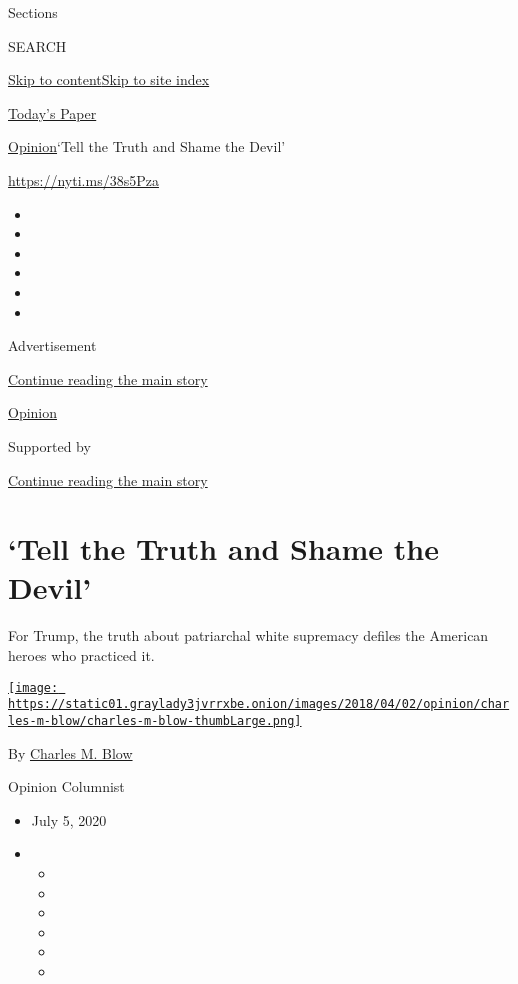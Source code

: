 Sections

SEARCH

\protect\hyperlink{site-content}{Skip to
content}\protect\hyperlink{site-index}{Skip to site index}

\href{https://myaccount.nytimes3xbfgragh.onion/auth/login?response_type=cookie\&client_id=vi}{}

\href{https://www.nytimes3xbfgragh.onion/section/todayspaper}{Today's
Paper}

\href{/section/opinion}{Opinion}\textbar{}`Tell the Truth and Shame the
Devil'

\url{https://nyti.ms/38s5Pza}

\begin{itemize}
\item
\item
\item
\item
\item
\item
\end{itemize}

Advertisement

\protect\hyperlink{after-top}{Continue reading the main story}

\href{/section/opinion}{Opinion}

Supported by

\protect\hyperlink{after-sponsor}{Continue reading the main story}

\hypertarget{tell-the-truth-and-shame-the-devil}{%
\section{`Tell the Truth and Shame the
Devil'}\label{tell-the-truth-and-shame-the-devil}}

For Trump, the truth about patriarchal white supremacy defiles the
American heroes who practiced it.

\href{https://www.nytimes3xbfgragh.onion/by/charles-m-blow}{\texttt{[image: https://static01.graylady3jvrrxbe.onion/images/2018/04/02/opinion/charles-m-blow/charles-m-blow-thumbLarge.png]}}

By \href{https://www.nytimes3xbfgragh.onion/by/charles-m-blow}{Charles
M. Blow}

Opinion Columnist

\begin{itemize}
\item
  July 5, 2020
\item
  \begin{itemize}
  \item
  \item
  \item
  \item
  \item
  \item
  \end{itemize}
\end{itemize}

